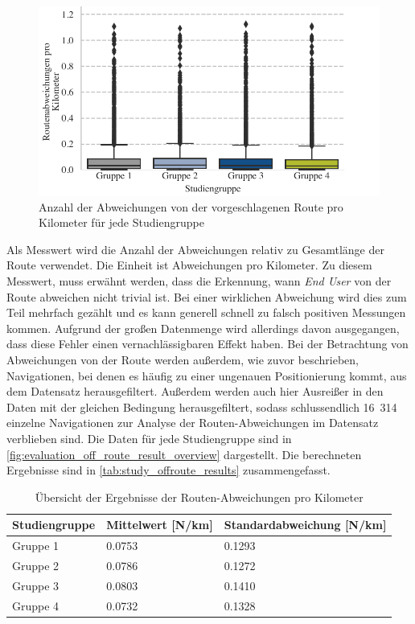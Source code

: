 \begin{figure}[htb!]
    \centering
    \includegraphics[width=\textwidth]{contents/06_model_evaluation/02_evaluation/res/off_route_result_overview.pdf}
    \caption{Anzahl der Abweichungen von der vorgeschlagenen Route pro Kilometer für jede Studiengruppe}
    \label{fig:evaluation_off_route_result_overview}
\end{figure}

Als Messwert wird die Anzahl der Abweichungen relativ zu Gesamtlänge der Route verwendet. Die Einheit ist Abweichungen pro Kilometer. Zu diesem Messwert, muss erwähnt werden, dass die Erkennung, wann \textit{End User} von der Route abweichen nicht trivial ist. Bei einer wirklichen Abweichung wird dies zum Teil mehrfach gezählt und es kann generell schnell zu falsch positiven Messungen kommen. Aufgrund der großen Datenmenge wird allerdings davon ausgegangen, dass diese Fehler einen vernachlässigbaren Effekt haben. Bei der Betrachtung von Abweichungen von der Route werden außerdem, wie zuvor beschrieben, Navigationen, bei denen es häufig zu einer ungenauen Positionierung kommt, aus dem Datensatz herausgefiltert. Außerdem werden auch hier Ausreißer in den Daten mit der gleichen Bedingung herausgefiltert, sodass schlussendlich 16~314 einzelne Navigationen zur Analyse der Routen-Abweichungen im Datensatz verblieben sind. Die Daten für jede Studiengruppe sind in \autoref{fig:evaluation_off_route_result_overview} dargestellt. Die berechneten Ergebnisse sind in \autoref{tab:study_offroute_results} zusammengefasst.

\begin{table}[htb!]
    \centering
    \begin{tabular}{p{}p{}p{}}
        \hline
        Studiengruppe  & Mittelwert [N/km] & Standardabweichung [N/km]\\
        \toprule
        Gruppe 1                & 0.0753 & 0.1293 \\
        Gruppe 2                & 0.0786 & 0.1272 \\
        Gruppe 3                & 0.0803 & 0.1410 \\
        Gruppe 4                & 0.0732 & 0.1328 \\
        \bottomrule
    \end{tabular}
    \caption{Übersicht der Ergebnisse der Routen-Abweichungen pro Kilometer}
    \label{tab:study_offroute_results}
\end{table}

